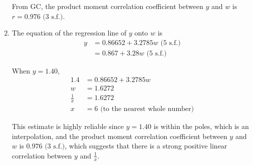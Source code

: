 \documentclass[11pt,a4paper]{book}
\begin{document}
\begin{example}
\begin{enumerate}[label=(\alph*)]
From GC, the product moment correlation coefficient between $y$ and
$w$ is $r=0.976\text{ (3 s.f.)}$.

\item  The equation of the regression line of $y$ onto $w$ is
\begin{align*}
y & =0.86652+3.2785w\text{ (5 s.f.)}\\
 & =0.867+3.28w\text{ (5 s.f.)}
\end{align*}

When $y=1.40$,
\begin{align*}
1.4 & =0.86652+3.2785w\\
w & =1.6272\\
\frac{1}{x} & =1.6272\\
x & =6\text{ (to the nearest whole number)}
\end{align*}

This estimate is highly reliable since $y=1.40$ is within the poles,
which is an interpolation, and the product moment correlation coefficient
between $y$ and $w$ is $0.976\text{ (3 s.f.)}$, which suggests
that there is a strong positive linear correlation between $y$ and
${\displaystyle \frac{1}{x}}$.

\end{enumerate}

\end{example}
\end{document}
